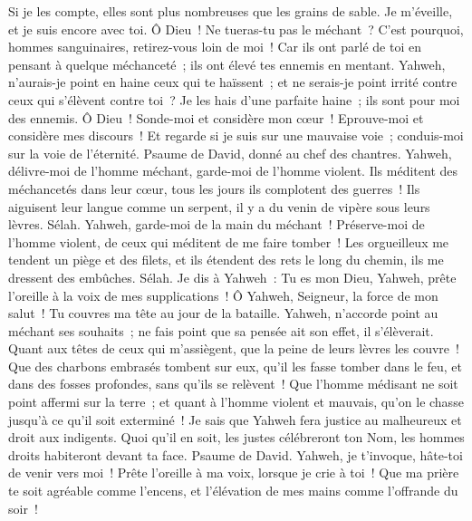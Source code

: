 \begin{multicols}{2}
Si je les compte, elles sont plus nombreuses que les grains de sable. Je m'éveille, et je suis encore avec toi.
Ô Dieu~! Ne tueras-tu pas le méchant~? C'est pourquoi, hommes sanguinaires, retirez-vous loin de moi~!
Car ils ont parlé de toi en pensant à quelque méchanceté~; ils ont élevé tes ennemis en mentant.
Yahweh, n'aurais-je point en haine ceux qui te haïssent~; et ne serais-je point irrité contre ceux qui s'élèvent contre toi~?
Je les hais d'une parfaite haine~; ils sont pour moi des ennemis.
Ô Dieu~! Sonde-moi et considère mon cœur~! Eprouve-moi et considère mes discours~!
Et regarde si je suis sur une mauvaise voie~; conduis-moi sur la voie de l'éternité.
\VerseOne{}Psaume de David, donné au chef des chantres. Yahweh, délivre-moi de l'homme méchant, garde-moi de l'homme violent.
Ils méditent des méchancetés dans leur cœur, tous les jours ils complotent des guerres~!
Ils aiguisent leur langue comme un serpent, il y a du venin de vipère sous leurs lèvres. Sélah.
Yahweh, garde-moi de la main du méchant~! Préserve-moi de l'homme violent, de ceux qui méditent de me faire tomber~!
Les orgueilleux me tendent un piège et des filets, et ils étendent des rets le long du chemin, ils me dressent des embûches. Sélah.
Je dis à Yahweh~: Tu es mon Dieu, Yahweh, prête l'oreille à la voix de mes supplications~!
Ô Yahweh, Seigneur, la force de mon salut~! Tu couvres ma tête au jour de la bataille.
Yahweh, n'accorde point au méchant ses souhaits~; ne fais point que sa pensée ait son effet, il s'élèverait.  
Quant aux têtes de ceux qui m'assiègent, que la peine de leurs lèvres les couvre~!
Que des charbons embrasés tombent sur eux, qu'il les fasse tomber dans le feu, et dans des fosses profondes, sans qu'ils se relèvent~!
Que l'homme médisant ne soit point affermi sur la terre~; et quant à l'homme violent et mauvais, qu'on le chasse jusqu'à ce qu'il soit exterminé~!
Je sais que Yahweh fera justice au malheureux et droit aux indigents.
Quoi qu'il en soit, les justes célébreront ton Nom, les hommes droits habiteront devant ta face.
\VerseOne{}Psaume de David. Yahweh, je t'invoque, hâte-toi de venir vers moi~! Prête l'oreille à ma voix, lorsque je crie à toi~!
Que ma prière te soit agréable comme l'encens, et l'élévation de mes mains comme l'offrande du soir~!

\end{multicols}
